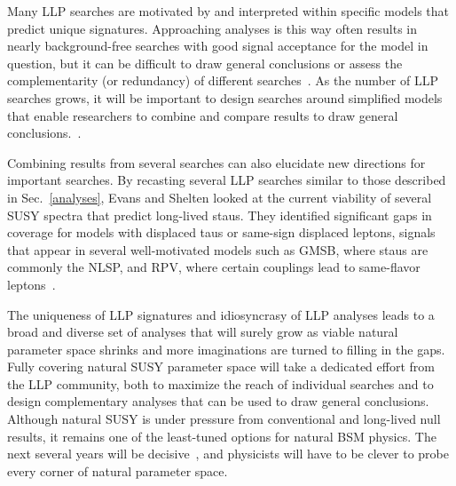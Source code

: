 \documentclass[12pt]{article}
\begin{document}
    Many LLP searches are motivated by and interpreted within specific models that predict unique signatures. Approaching analyses is this way often results in nearly background-free searches with good signal acceptance for the model in question, but it can be difficult to draw general conclusions or assess the complementarity (or redundancy) of different searches~\cite{fate}. As the number of LLP searches grows, it will be important to design searches around simplified models that enable researchers to combine and compare results to draw general conclusions.~\cite{evans_talk}.

    Combining results from several searches can also elucidate new directions for important searches. By recasting several LLP searches similar to those described in Sec.~\ref{analyses}, Evans and Shelten looked at the current viability of several SUSY spectra that predict long-lived staus. They identified significant gaps in coverage for models with displaced taus or same-sign displaced leptons, signals that appear in several well-motivated models such as GMSB, where staus are commonly the NLSP, and RPV, where certain couplings lead to same-flavor leptons~\cite{ll_staus}. 

    The uniqueness of LLP signatures and idiosyncrasy of LLP analyses leads to a broad and diverse set of analyses that will surely grow as viable natural parameter space shrinks and more imaginations are turned to filling in the gaps. Fully covering natural SUSY parameter space will take a dedicated effort from the LLP community, both to maximize the reach of individual searches and to design complementary analyses that can be used to draw general conclusions. Although natural SUSY is under pressure from conventional and long-lived null results, it remains one of the least-tuned options for natural BSM physics. The next several years will be decisive~\cite{cornering}, and physicists will have to be clever to probe every corner of natural parameter space.

\clearpage
\pagebreak
\singlespacing
{}

\end{document}
